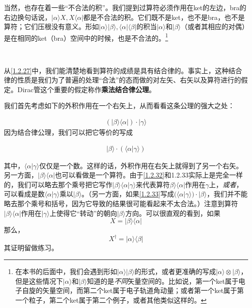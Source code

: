\documentclass[UTF8,twoside]{ctexart}
\def\be{\begin{equation}}
\def\ee{\end{equation}}
\begin{document}
当然，也存在着一些``不合法的积''。我们提到过算符必须作用在ket的左边，bra的右边换句话说，$|\alpha\rangle X, X\langle\alpha|$都是不合法的积。它们既不是ket，也不是bra，也不是算符；它们压根没有意义。形如$|\alpha\rangle|\beta\rangle,\langle\alpha|\langle\beta|$的积当$|\alpha\rangle$和$|\beta\rangle$（或者其相应的对偶）是在相同的ket（bra）空间中的时候，也是不合法的。\footnote{在本书的后面中，我们会遇到形如$|\alpha\rangle|\beta\rangle$的形式，或者更准确的写成$|\alpha\rangle\otimes|\beta\rangle$，但是这些情况下$|\alpha\rangle$和$|\beta\rangle$知道的是{\emph{不同}}矢量空间的。比如说，第一个ket属于电子自旋的矢量空间，而第二个ket属于电子轨道角动量；或者第一个ket属于第一个粒子，第二个ket属于第二个例子，或者其他类似这样的。}

\ 


\noindent 从\eqref{1.2.27}中，我们能清楚地看到算符的成绩是具有结合律的。事实上，这种结合律的性质是我们为了普遍的处理``合法''的态而做的对左矢、右矢以及算符进行的假定。Dirac管这个重要的假定称作{\bf 乘法结合律公理}。

我们首先考虑如下的外积作用在一个右矢上，从而看看这条公理的强大之处：

\begin{align}\label{1.2.32}
(|\beta\rangle\langle\alpha|)\cdot|\gamma\rangle
\end{align}
因为结合律公理，我们可以把它等价的写成

\begin{align}\label{1.2.33}
|\beta\rangle\cdot(\langle\alpha|\gamma\rangle)
\end{align}

\noindent 其中，$\langle\alpha|\gamma\rangle$仅仅是一个数。这样的话，外积作用在右矢上就得到了另一个右矢。另一方面，$|\beta\rangle\langle\alpha|$也可以看做是一个算符。由于\eqref{1.2.32}和{1.2.33}实际上是完全一样的，我们可以略去那个乘号把它写作$|\beta\rangle\langle\alpha|\gamma\rangle$来代表算符$\beta\rangle\langle\alpha|$作用在$\gamma$上，{\it 或者}，可以看成是数$\langle\alpha|\gamma\rangle$乘以$|\beta\rangle$。（另一方面，如果\eqref{1.2.33}写成$(\langle\alpha|\gamma\rangle)\cdot|\beta\rangle$，我们并不能略去那个乘号和括号，因为它导致的结果很可能看起来不太合法。）注意到算符$|\beta\rangle\langle\alpha|$作用在$|\gamma\rangle$上使得它``转动''的朝向$|\beta\rangle$方向。可以很直观的看到，如果
\be
X=|\beta\rangle\langle\alpha|
\ee
那么，
\be
X^\dagger = |\alpha\rangle\langle\beta|
\ee
其证明留做练习。
\end{document}
